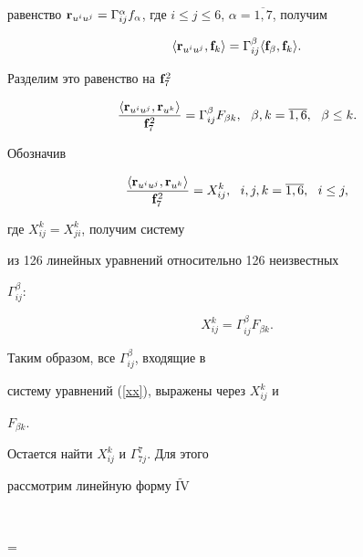 равенство $\bold{r}_{u^iu^j}= \Gamma_{ij}^\alpha


f_\alpha$, где $i\leq j\leq 6$, $\alpha=\overline{1,7}$, получим


$$


\langle \bold{r}_{u^iu^j},\bold{f}_k\rangle=


\Gamma_{ij}^\beta\langle


\bold{f}_\beta,\bold{f}_k\rangle.


$$


Разделим это равенство на $\bold{f}_7^2$


$$


\frac{\langle


\bold{r}_{u^iu^j},\bold{r}_{u^k}\rangle}{\bold{f}_7^2}=


\Gamma_{ij}^\beta


F_{\beta k},\ \ \beta,k=\overline{1,6},\ \ \beta\leq k.


$$


Обозначив


$$


\frac{\langle


\bold{r}_{u^iu^j},\bold{r}_{u^k}\rangle}{\bold{f}_7^2}=


X_{ij}^k, \ \ i,j,k=\overline{1,6},


\ \ i\leq j,


$$


где $X_{ij}^k=X_{ji}^k$, получим систему


из 126 линейных уравнений относительно 126 неизвестных


$\Gamma_{ij}^\beta$:


\begin{equation}\label{xx}


X_{ij}^k=\Gamma_{ij}^\beta F_{\beta k}.


\end{equation}


Таким образом, все $\Gamma_{ij}^\beta$, входящие в


систему уравнений (\ref{xx}), выражены через $X_{ij}^k$ и


$F_{\beta k}$.





Остается найти $X_{ij}^k$ и $\Gamma_{7j}^7$. Для этого


рассмотрим линейную форму $\widetilde{\mathrm{IV}}$


$$


=


